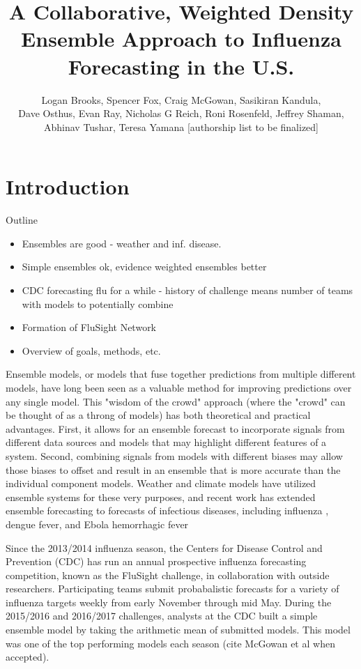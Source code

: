 \documentclass{article}
\title{A Collaborative, Weighted Density Ensemble Approach to Influenza Forecasting in the U.S.}
\author{Logan Brooks, Spencer Fox, Craig McGowan, Sasikiran Kandula, \\ Dave Osthus, Evan Ray, Nicholas G Reich, Roni Rosenfeld, Jeffrey Shaman, \\Abhinav Tushar, Teresa Yamana [authorship list to be finalized]}
\begin{document}


\maketitle

\tableofcontents



\section{Introduction}

Outline
\begin{itemize}
    \item Ensembles are good - weather and inf. disease.
    \item Simple ensembles ok, evidence weighted ensembles better
    \item CDC forecasting flu for a while - history of challenge means number of teams with models to potentially combine
    \item Formation of FluSight Network
    \item Overview of goals, methods, etc.
\end{itemize}

Ensemble models, or models that fuse together predictions from multiple different models, have long been seen as a valuable method for improving predictions over any single model. This "wisdom of the crowd" approach (where the "crowd" can be thought of as a throng of models) has both theoretical and practical advantages. First, it allows for an ensemble forecast to incorporate signals from different data sources and models that may highlight different features of a system. Second, combining signals from models with different biases may allow those biases to offset and result in an ensemble that is more accurate than the individual component models. Weather and climate models have utilized ensemble systems for these very purposes, and recent work has extended ensemble forecasting to forecasts of infectious diseases, including influenza , dengue fever, and Ebola hemorrhagic fever %

Since the 2013/2014 influenza season, the Centers for Disease Control and Prevention (CDC) has run an annual prospective influenza forecasting competition, known as the FluSight challenge, in collaboration with outside researchers. Participating teams submit probabalistic forecasts for a variety of influenza targets weekly from early November through mid May. During the 2015/2016 and 2016/2017 challenges, analysts at the CDC built a simple ensemble model by taking the arithmetic mean of submitted models. This model was one of the top performing models each season (cite McGowan et al when accepted).
\end{document}
